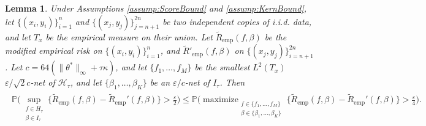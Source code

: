 \documentclass[twoside, onecolumn]{article}
\DeclareMathOperator*{\maximize}{maximize}
\newtheorem{lemma}{Lemma}
\begin{document}
\begin{lemma}\label{lem:EpsilonNetInSymmetrization}
Under Assumptions \ref{assump:ScoreBound} and \ref{assump:KernBound},
let $\{(x_i, y_i)\}_{i=1}^{n}$ and $\{(x_j, y_j)\}_{j=n+1}^{2n}$ be two independent copies of i.i.d. data, and let $T_x$ be the empirical measure on their union. Let $\widetilde{R}_{\text{emp}}(f,\beta)$ be the modified empirical risk on $\{(x_i, y_i)\}_{i=1}^{n}$, and $\widetilde{R}'_{\text{emp}}(f,\beta)$ on $\{(x_j, y_j)\}_{i=n+1}^{2n}$. Let $c=64(\|\theta^\ast\|_\infty+\tau \kappa)$, and let $\{f_1, \dots, f_M\}$ be the smallest $L^2(T_x)$ $\varepsilon/\sqrt{2}c$-net of $\mathcal{H}_\tau$, and let  $\{\beta_1, \dots, \beta_K\}$ be an $\varepsilon/c$-net of $I_\tau$. Then
\begin{align*}%
\begin{split}
\mathbb{P}\bigg(\sup_{\substack{f\in H_\tau\\
\beta\in I_\tau}}\{\widetilde{R}_{\text{emp}}(f,\beta)-\widetilde{R}_{\text{emp}}'(f,\beta)\}>\frac{\varepsilon}{2} \bigg) 
\leq\mathbb{P}\bigg( 
\maximize_{\substack{f\in \{f_1, \dots, f_M\}\\ \beta\in \{\beta_1, \dots, \beta_K\}}}
\{\widetilde{R}_{\text{emp}}(f,\beta)-\widetilde{R}_{\text{emp}}'(f,\beta)\}>\frac{\varepsilon}{4}
\bigg).
\end{split}
\end{align*}
\end{lemma}
\end{document}
